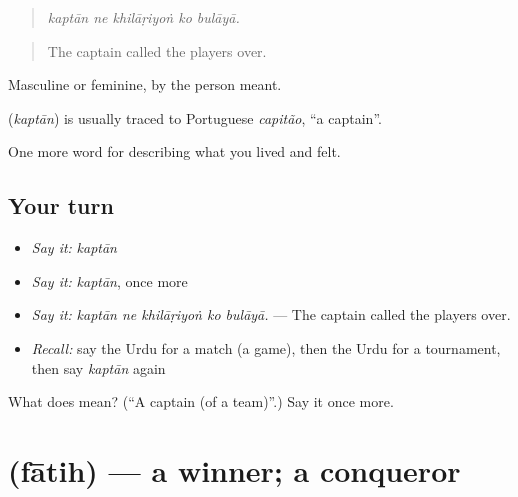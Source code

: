\begin{quote}
    
\end{quote}

\begin{quote}
\emph{kaptān ne khilāṛiyoṅ ko bulāyā.}
\end{quote}

\begin{quote}
The captain called the players over.
\end{quote}

Masculine or feminine, by the person meant.

\begin{cousinweb}
\textbf{} (\emph{kaptān}) is usually traced to Portuguese \emph{capitão}, \textquotedblleft{}a captain\textquotedblright{}.
\end{cousinweb}

\begin{grammarlens}[title={What you've built}]
One more word for describing what you lived and felt.
\end{grammarlens}

\subsection*{Your turn}
\begin{itemize}
\raggedright
  \item \emph{Say it:} \emph{kaptān}
  \item \emph{Say it:} \emph{kaptān}, once more
  \item \emph{Say it:} \emph{kaptān ne khilāṛiyoṅ ko bulāyā.} — The captain called the players over.
  \item \emph{Recall:} say the Urdu for a match (a game), then the Urdu for a tournament, then say \emph{kaptān} again
\end{itemize}

\begin{tcolorbox}[breakable,colback=teal!4,colframe=teal!35!black,title={Before you move on}]
What does  mean? (\textquotedblleft{}A captain (of a team)\textquotedblright{}.) Say it once more.
\end{tcolorbox}
\section[\texorpdfstring{\ur{فاتح} (fātih)}{فاتح (fātih)}]{ (fātih) — a winner; a conqueror}

\label{lesson:UR-C521-fatih}



